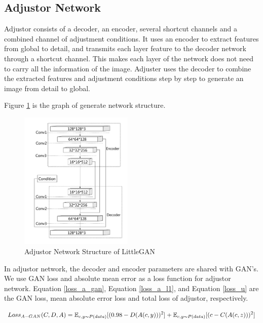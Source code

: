 \subsection{Adjustor Network}
Adjustor consists of a decoder, an encoder, several shortcut channels and a combined channel of adjustment conditions.
It uses an encoder to extract features from global to detail,
    and transmits each layer feature to the decoder network through a shortcut channel.
This makes each layer of the network does not need to carry all the information of the image.
Adjuster uses the decoder to combine the extracted features and adjustment conditions step by step to generate an image from detail to global.

Figure \ref{net_adjustor} is the graph of generate network structure.

\begin{figure}
    \begin{center}
    \includegraphics[width=0.48\textwidth]{figures/net_adjustor.pdf}
    \caption{Adjustor Network Structure of LittleGAN}
    \label{net_adjustor}
    \end{center}
\end{figure}

In adjustor network, the decoder and encoder parameters are shared with GAN's.
We use GAN loss and absolute mean error as a loss function for adjustor network.
Equation \eqref{loss_a_gan}, Equation \eqref{loss_a_l1}, and Equation \eqref{loss_u} are the GAN loss,
    mean absolute error loss and total loss of adjustor, respectively.

\begin{equation}
    Loss_{A-GAN}(C,D,A)=
    \mathbb{E}_{c,y\thicksim P(data)}[(0.98-D(A(c,y)))^2]+
    \mathbb{E}_{c,y\thicksim P(data)}[(c-C(A(c,z)))^2]
    \label{loss_a_gan}
\end{equation}

